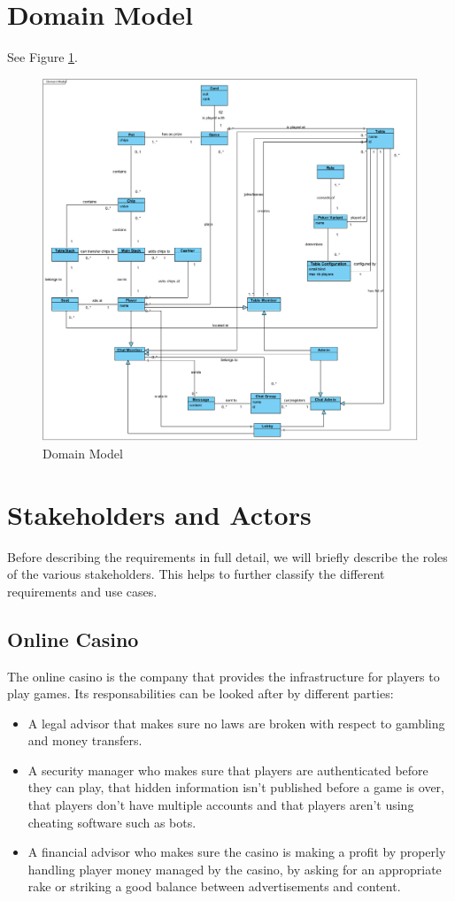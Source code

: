 \documentclass[a4paper,11pt]{report}
\begin{document}
\section{Domain Model}
See Figure \ref{fig:domain}.
\begin{figure}
  \begin{center}
    \includegraphics[scale=0.5]{img_domain_model.png}
  \end{center}
  \caption{Domain Model}\label{fig:domain}
\end{figure}
\section{Stakeholders and Actors}
Before  describing the requirements in full detail, we will briefly describe the roles of  the  various 
stakeholders. This helps to further classify the different requirements and use cases.

\subsection{Online Casino}
The online casino is the company that provides the infrastructure for players to play games. Its responsabilities can be looked after by different parties:
\begin{itemize}
 \item A legal advisor that makes sure no laws are broken with respect to gambling and money transfers.
 \item A security manager who makes sure that players are authenticated before they can play, that hidden information isn't published before a game is over, that players don't have multiple accounts and that players aren't using cheating software such as bots.
 \item A financial advisor who makes sure the casino is making a profit by properly handling player money managed by the casino, by asking for an appropriate rake or striking a good balance between advertisements and content.
\end{itemize}
\end{document}
